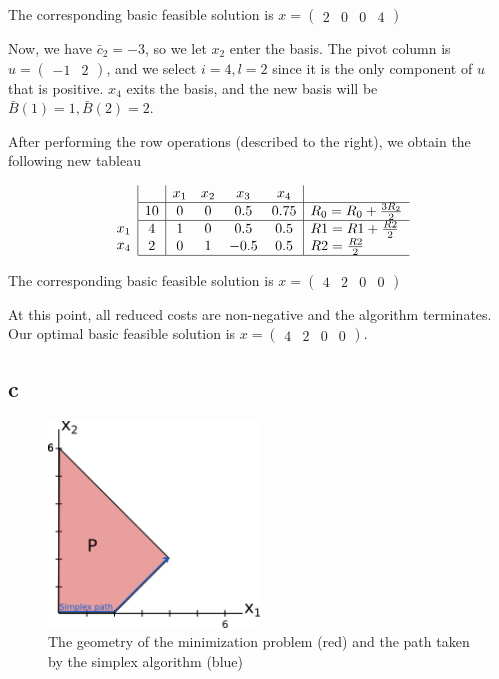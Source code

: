 \documentclass[11pt,a4paper]{article}
\begin{document}
The corresponding basic feasible solution is $x=\begin{pmatrix}2 & 0 & 0 & 4\end{pmatrix}$

Now, we have $\bar{c}_2=-3$, so we let $x_2$ enter the basis. The pivot column is $u=\begin{pmatrix}-1 & 2\end{pmatrix}$, and we select $i=4,l=2$ since it is the only component of $u$ that is positive. $x_4$ exits the basis, and the new basis will be $\bar{B}(1)=1, \bar{B}(2)=2$.

After performing the row operations (described to the right), we obtain the following new tableau

$$
\begin{array}{c}
\\
 \\
x_1 \\
x_4 \\ 
\end{array}
\begin{array}{|c|cccc|l}
    & x_1 & x_2 & x_3 & x_4 & \\ \hline
  10& 0 & 0 & 0.5 & 0.75 & R_0=R_0+\frac{3R_2}{2} \\  \hline
  4 & 1 & 0 & 0.5 & 0.5 & R1=R1+\frac{R2}{2}\\
  2 & 0 & 1 & -0.5 & 0.5 & R2 = \frac{R2}{2}\\\hline
\end{array}
$$

The corresponding basic feasible solution is $x=\begin{pmatrix}4 & 2 & 0 & 0\end{pmatrix}$


At this point, all reduced costs are non-negative and the algorithm terminates. Our optimal basic feasible solution is $x=\begin{pmatrix}4 & 2 & 0 & 0\end{pmatrix}$.

\subsection{c}

\begin{figure}[h]
\includegraphics[width=0.5\textwidth]{4c}
\centering
\caption{The geometry of the minimization problem (red) and the path taken by the simplex algorithm (blue)}
\end{figure}
\end{document}
